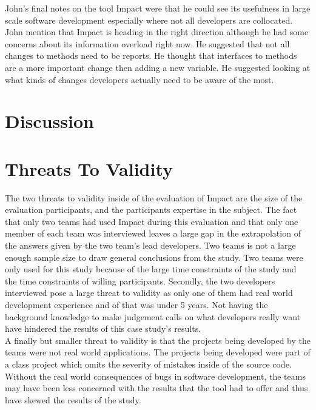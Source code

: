 \documentclass[conference]{IEEEtran}
\begin{document}
John's final notes on the tool Impact were that he could see its usefulness in large scale software
development especially where not all developers are collocated. John mention that Impact is
heading in the right direction although he had some concerns about its information overload
right now. He suggested that not all changes to methods need to be reports. He thought that
interfaces to methods are a more important change then adding a new variable. He suggested
looking at what kinds of changes developers actually need to be aware of the most.\\

 

\section{Discussion}

\section{Threats To Validity}
The two threats to validity inside of the evaluation of Impact are the size of the evaluation
participants, and the participants expertise in the subject. The fact that only two teams had
used Impact during this evaluation and that only one member of each team was interviewed
leaves a large gap in the extrapolation of the answers given by the two team's lead 
developers. Two teams is not a large enough sample size to draw general conclusions
from the study. Two teams were only used for this study because of the large time constraints
of the study and the time constraints of willing participants. Secondly, the two developers
interviewed pose a large threat to validity as only one of them had real world development
experience and of that was under 5 years. Not having the background knowledge to make
judgement calls on what developers really want have hindered the results of this case study's 
results. \\

A finally but smaller threat to validity is that the projects being developed by the teams were
not real world applications. The projects being developed were part of a class project which
omits the severity of mistakes inside of the source code. Without the real world consequences
of bugs in software development, the teams may have been less concerned with the results
that the tool had to offer and thus have skewed the results of the study.\\
\end{document}
